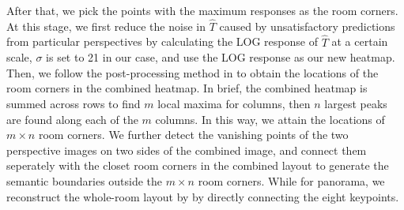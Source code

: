 %
After that, we pick the points with the maximum responses as the room corners. 
At this stage, we first reduce the noise in $\hat{T}$ caused by unsatisfactory predictions from particular perspectives by calculating the LOG response of $\hat{T}$ at a certain scale, $\sigma$ is set to 21 in our case, and use the LOG response as our new heatmap.
%
Then, we follow the post-processing method in \cite{zou2018layoutnet} to obtain the locations of the room corners in the combined heatmap. In brief, the combined heatmap is summed across rows to find $m$ local maxima for columns, then $n$ largest peaks are found along each of the $m$ columns. In this way, we attain the locations of $m \times n$ room corners. We further detect the vanishing points of the two perspective images on two sides of the combined image, and connect them seperately with the closet room corners in the combined layout to generate the semantic boundaries outside the $m \times n$ room corners. While for panorama, we reconstruct the whole-room layout by by directly connecting the eight keypoints.
%


